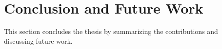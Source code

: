 \chapter{Conclusion and Future Work}

This section concludes the thesis by summarizing the contributions and discussing future work.







